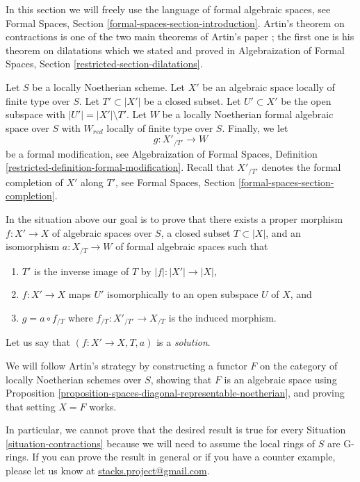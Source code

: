 \noindent
In this section we will freely use the language of formal algebraic spaces,
see Formal Spaces, Section \ref{formal-spaces-section-introduction}.
Artin's theorem on contractions is one of the two main theorems of
Artin's paper \cite{ArtinII}; the first one is his theorem on dilatations
which we stated and proved in Algebraization of Formal Spaces,
Section \ref{restricted-section-dilatations}.

\begin{situation}
\label{situation-contractions}
Let $S$ be a locally Noetherian scheme. Let $X'$ be an algebraic space
locally of finite type over $S$. Let $T' \subset |X'|$ be a closed
subset. Let $U' \subset X'$ be the open subspace with
$|U'| = |X'| \setminus T'$. Let $W$ be a locally Noetherian
formal algebraic space over $S$ with $W_{red}$ locally of finite type
over $S$. Finally, we let
$$
g : X'_{/T'} \longrightarrow W
$$
be a formal modification, see
Algebraization of Formal Spaces, Definition
\ref{restricted-definition-formal-modification}.
Recall that $X'_{/T'}$ denotes the formal completion of $X'$ along
$T'$, see Formal Spaces, Section \ref{formal-spaces-section-completion}.
\end{situation}

\noindent
In the situation above our goal is to prove that there exists a
proper morphism $f : X' \to X$ of algebraic spaces over $S$,
a closed subset $T \subset |X|$, and an isomorphism
$a : X_{/T} \to W$ of formal algebraic spaces such that
\begin{enumerate}
\item $T'$ is the inverse image of $T$ by $|f| : |X'| \to |X|$,
\item $f : X' \to X$ maps $U'$ isomorphically to
an open subspace $U$ of $X$, and
\item $g = a \circ f_{/T}$ where $f_{/T} : X'_{/T'} \to X_{/T}$
is the induced morphism.
\end{enumerate}
Let us say that $(f : X' \to X, T, a)$ is a {\it solution}.

\medskip\noindent
We will follow Artin's strategy by constructing a functor $F$ on
the category of locally Noetherian schemes over $S$, showing that $F$ is an
algebraic space using
Proposition \ref{proposition-spaces-diagonal-representable-noetherian},
and proving that setting $X = F$ works.

\begin{remark}
\label{remark-G-rings}
In particular, we cannot prove that the desired result is true for
every Situation \ref{situation-contractions} because we will need to
assume the local rings of $S$ are G-rings. If you can prove the
result in general or if you have a counter example, please let
us know at
\href{mailto:stacks.project@gmail.com}{stacks.project@gmail.com}.
\end{remark}

